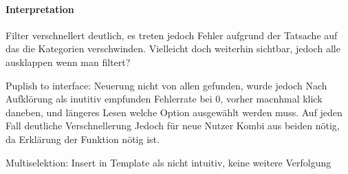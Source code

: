 \paragraph{Interpretation}
Filter verschnellert deutlich, es treten jedoch Fehler aufgrund der Tatsache auf das die Kategorien verschwinden.
Vielleicht doch weiterhin sichtbar, jedoch alle ausklappen wenn man filtert?

Puplish to interface:
Neuerung nicht von allen gefunden, wurde jedoch Nach Aufklörung als inutitiv empfunden
Fehlerrate bei 0, vorher macnhmal klick daneben, und längeres Lesen welche Option ausgewählt werden muss.
Auf jeden Fall deutliche Verschnellerung
Jedoch für neue Nutzer Kombi aus beiden nötig, da Erklärung der Funktion nötig ist.

Multiselektion:
 Insert in Template als nicht intuitiv, keine weitere Verfolgung


